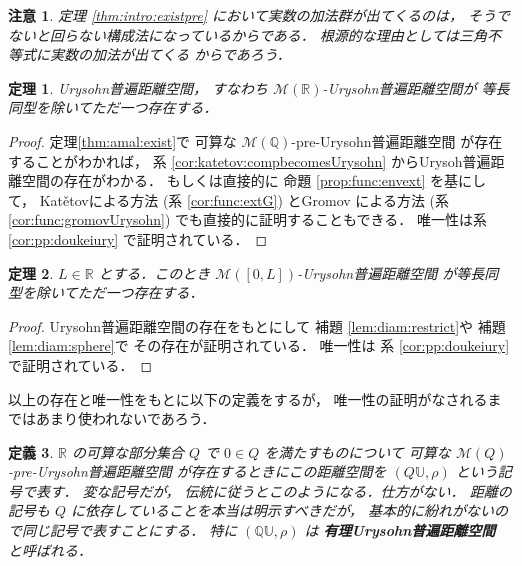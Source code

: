 \documentclass[leqno, 12pt]{jsarticle}
\newtheorem{thm}{定理}[section]
\newtheorem{df}[thm]{定義}
\newtheorem*{rmk}{注意}
\newcommand{\qq}{\mathbb{Q}}
\newcommand{\rr}{\mathbb{R}}
\begin{document}
\begin{rmk}
定理 \ref{thm:intro:existpre}
において実数の加法群が出てくるのは，
そうでないと回らない構成法になっているからである．
根源的な理由としては三角不等式に実数の加法が出てくる
からであろう．
\end{rmk}



\begin{thm}\label{thm:intro:existpropUry}
Urysohn普遍距離空間，
すなわち
$\mathscr{M}({\rr})$-Urysohn普遍距離空間が
等長同型を除いてただ一つ存在する．
\end{thm}
\begin{proof}
定理\ref{thm:amal:exist}で
可算な
$\mathscr{M}(\qq)$-pre-Urysohn普遍距離空間
が存在することがわかれば，
系 \ref{cor:katetov:compbecomesUrysohn}
からUrysoh普遍距離空間の存在がわかる．
もしくは直接的に
命題 
\ref{prop:func:envext}
を基にして，
Kat\v{e}tovによる方法 
(系 \ref{cor:func:extG})
とGromov による方法
(系 \ref{cor:func:gromovUrysohn})
でも直接的に証明することもできる．
唯一性は系 
\ref{cor:pp:doukeiury}
で証明されている．
\end{proof}


\begin{thm}\label{thm:intro:existdiam}
$L\in \rr$
とする．このとき
$\mathscr{M}([0, L])$-Urysohn普遍距離空間
が等長同型を除いてただ一つ存在する．
\end{thm}


\begin{proof}
Urysohn普遍距離空間の存在をもとにして
補題 
\ref{lem:diam:restrict}や
補題 
\ref{lem:diam:sphere}で
その存在が証明されている．
唯一性は
系 
\ref{cor:pp:doukeiury}
で証明されている．
\end{proof}


以上の存在と唯一性をもとに以下の定義をするが，
唯一性の証明がなされるまではあまり使われないであろう．



\begin{df}\label{df:intro:preUrysohnspaces}
$\rr$
の可算な部分集合
$Q$
で
$0\in Q$
を満たすものについて
可算な
$\mathscr{M}(Q)$-pre-Urysohn普遍距離空間
が存在するときにこの距離空間を
$(Q\mathbb{U}, \rho)$
という記号で表す．
変な記号だが，
伝統に従うとこのようになる．仕方がない．
距離の記号も
$Q$
に依存していることを本当は明示すべきだが，
基本的に紛れがないので同じ記号で表すことにする．
特に
$(\qq\mathbb{U}, \rho)$
は
\textbf{有理Urysohn普遍距離空間}
と呼ばれる．
\end{df}
\end{document}
